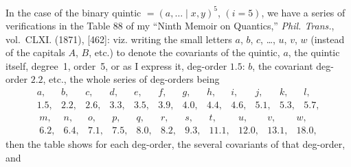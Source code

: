 \documentclass[11pt]{article}
\begin{document}
In the case of the binary quintic $= (a, \dots \mid x, y)^{5}$, $(i = 5)$, we have a series of verifications in the Table 88 of my ``Ninth Memoir on Quantics,'' \textit{Phil. Trans.}, vol.~CLXI. (1871), [462]: viz. writing the small letters $a$, $b$, $c$, \dots, $u$, $v$, $w$ (instead of the capitals $A$, $B$, etc.) to denote the covariants of the quintic, $a$, the quintic itself, degree~1, order~5, or as I express it, deg-order $1.5$: $b$, the covariant deg-order $2.2$, etc., the whole series of deg-orders being
\[ \begin{array}{cccccccccccc}
a, & b, & c, & d, & e, & f, & g, & h, & i, & j, & k, & l,\\
1.5,& 2.2,& 2.6,& 3.3,& 3.5,& 3.9,& 4.0,& 4.4,& 4.6,& 5.1,& 5.3,& 5.7,
\end{array} \]
\[ \begin{array}{ccccccccccc}
m, & n, & o, & p, & q, & r, & s, & t, & u, & v, & w,\\
6.2,& 6.4,& 7.1,& 7.5,& 8.0,& 8.2,& 9.3,& 11.1,& 12.0,& 13.1,& 18.0,
\end{array} \]
then the table shows for each deg-order, the several covariants of that deg-order, and
\end{document}
